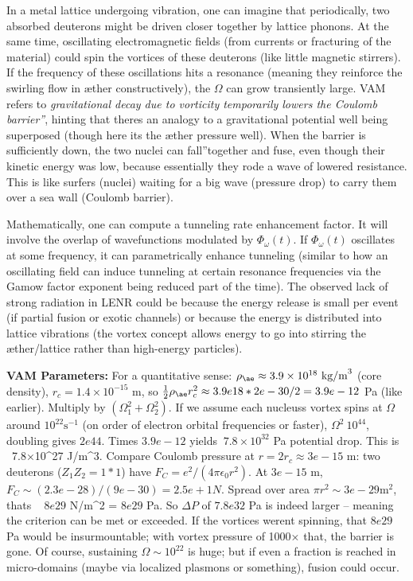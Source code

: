 \documentclass[a4paper, aps,preprint,superscriptaddress, 12pt]{revtex4}
\begin{document}
In a metal lattice undergoing vibration, one can imagine that periodically, two absorbed deuterons might be driven closer together by lattice phonons. At the same time, oscillating electromagnetic fields (from currents or fracturing of the material) could spin the vortices of these deuterons (like little magnetic stirrers). If the frequency of these oscillations hits a resonance (meaning they reinforce the swirling flow in æther constructively), the $\Omega$ can grow transiently large. VAM refers to \textit{\grqq gravitational decay due to vorticity temporarily lowers the Coulomb barrier\textquotedblright}, hinting that there\rqs s an analogy to a gravitational potential well being superposed (though here it\rqs s the æther pressure well). When the barrier is sufficiently down, the two nuclei can \grqq fall\textquotedblright together and fuse, even though their kinetic energy was low, because essentially they rode a wave of lowered resistance. This is like surfers (nuclei) waiting for a big wave (pressure drop) to carry them over a sea wall (Coulomb barrier).


Mathematically, one can compute a tunneling rate enhancement factor. It will involve the overlap of wavefunctions modulated by $\Phi_\omega(t)$. If $\Phi_\omega(t)$ oscillates at some frequency, it can parametrically enhance tunneling (similar to how an oscillating field can induce tunneling at certain resonance frequencies via the Gamow factor exponent being reduced part of the time). The observed lack of strong radiation in LENR could be because the energy release is small per event (if partial fusion or exotic channels) or because the energy is distributed into lattice vibrations (the vortex concept allows energy to go into stirring the æther/lattice rather than high-energy particles).


\textbf{VAM Parameters:} For a quantitative sense: $\rho_{\ae}\approx3.9\times10^{18}~\text{kg/m}^3$ (core density), $r_c=1.4\times10^{-15}$ m, so $\frac{1}{2}\rho_{\ae}r_c^2 \approx 3.9e18 * 2e-30 /2 = 3.9e-12$ Pa (like earlier). Multiply by $(\Omega_1^2+\Omega_2^2)$. If we assume each nucleus\rqs s vortex spins at $\Omega$ around $10^{22}\text{s}^{-1}$ (on order of electron orbital frequencies or faster), $\Omega^2 ~ 10^{44}$, doubling gives $2e44$. Times $3.9e-12$ yields $~7.8\times10^{32}$ Pa potential drop. This is ~7.8×10^27 J/m^3. Compare Coulomb pressure at $r=2r_c \approx3e-15$ m: two deuterons ($Z_1Z_2=1*1$) have $F_C = e^2/(4\pi\epsilon_0 r^2)$. At $3e-15$ m, $F_C\sim (2.3e-28)/ (9e-30) =2.5e+1 N$. Spread over area $\pi r^2 \sim 3e-29 \text{m}^2$, that\rqs s ~ $8e29$ N/m^2 = $8e29$ Pa. So $\Delta P$ of $7.8e32$ Pa is indeed larger – meaning the criterion can be met or exceeded. If the vortices weren\rqs t spinning, that $8e29$ Pa would be insurmountable; with vortex pressure of 1000× that, the barrier is gone. Of course, sustaining $\Omega \sim10^{22}$ is huge; but if even a fraction is reached in micro-domains (maybe via localized plasmons or something), fusion could occur.
\end{document}
